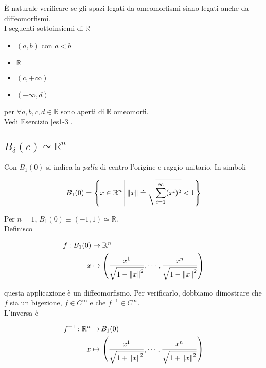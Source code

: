 \`{E} naturale verificare se gli spazi legati da omeomorfismi siano legati anche da diffeomorfismi.\\
I seguenti sottoinsiemi di $ \mathbb{R} $

\begin{itemize}
	\item $ (a,b) $ con $ a<b $
	
	\item $ \mathbb{R} $
	
	\item $ (c, + \infty) $
	
	\item $ (- \infty, d) $
\end{itemize}

per  $ \forall a,b,c,d \in \mathbb{R} $ sono aperti di $ \mathbb{R} $ omeomorfi.\\
Vedi Esercizio \ref{es1-3}.

\subsection{$ B_{\delta} (c) \simeq \mathbb{R}^{n} $}

Con $ B_{1} (0) $ si indica la \textit{palla} di centro l'origine e raggio unitario. In simboli

\begin{equation}
	B_{1} (0) = \left\{ x \in \mathbb{R}^{n} \, \middle| \, \norm{x} \doteq \sqrt{\sum_{i=1}^{\infty} (x^{i})^{2}} < 1 \right\}
\end{equation}

Per $ n=1 $, $ B_{1} (0) \equiv (-1,1) \simeq \mathbb{R} $.\\
Definisco

\begin{align}
	\begin{split}
		f : B_{1} (0) &\to \mathbb{R}^{n}\\
		x &\mapsto \left( \dfrac{x^{1}}{\sqrt{1 - \norm{x}^{2}}}, \cdots, \dfrac{x^{n}}{\sqrt{1 - \norm{x}^{2}}} \right)
	\end{split}	
\end{align}

questa applicazione è un diffeomorfismo. Per verificarlo, dobbiamo dimostrare che $ f $ sia un bigezione, $ f \in C^{\infty} $ e che $ f^{-1} \in C^{\infty} $.\\
L'inversa è

\begin{align}
	\begin{split}
		f^{-1} : \mathbb{R}^{n} \to& \, B_{1} (0)\\
		x \mapsto& \, \left( \dfrac{x^{1}}{\sqrt{1 + \norm{x}^{2}}}, \cdots, \dfrac{x^{n}}{\sqrt{1 + \norm{x}^{2}}} \right)
	\end{split}
\end{align}

